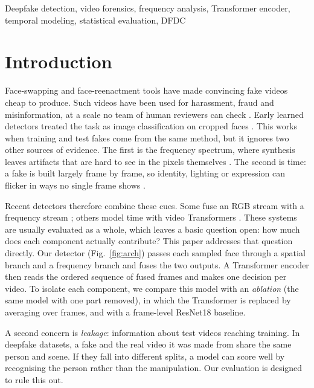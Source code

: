 \documentclass[conference]{IEEEtran}
\begin{document}
\begin{IEEEkeywords}
Deepfake detection, video forensics, frequency analysis, Transformer encoder,
temporal modeling, statistical evaluation, DFDC
\end{IEEEkeywords}

\section{Introduction}

Face-swapping and face-reenactment tools have made convincing fake videos
cheap to produce. Such videos have been used for harassment, fraud and
misinformation, at a scale no team of human reviewers can check
\cite{tolosana2020survey}. Early learned detectors treated the task as image
classification on cropped faces \cite{rossler2019faceforensics}. This works
when training and test fakes come from the same method, but it ignores two
other sources of evidence. The first is the frequency spectrum, where
synthesis leaves artifacts that are hard to see in the pixels themselves
\cite{qian2020thinking,tan2024freqnet}. The second is time: a fake is built
largely frame by frame, so identity, lighting or expression can flicker in
ways no single frame shows \cite{wang2023altfreezing}.

Recent detectors therefore combine these cues. Some fuse an RGB stream with a
frequency stream \cite{luo2021highfreq,wang2023sfdg}; others model time with
video Transformers \cite{zhao2023istvt}. These systems are usually evaluated
as a whole, which leaves a basic question open: how much does each component
actually contribute? This paper addresses that question directly. Our
detector (Fig.~\ref{fig:arch}) passes each sampled face through a spatial
branch and a frequency branch and fuses the two outputs. A Transformer
encoder \cite{vaswani2017attention} then reads the ordered sequence of fused
frames and makes one decision per video. To isolate each component, we
compare this model with an \emph{ablation} (the same model with one part
removed), in which the Transformer is replaced by averaging over frames, and
with a frame-level ResNet18 \cite{he2016deep} baseline.

A second concern is \emph{leakage}: information about test videos reaching
training. In deepfake datasets, a fake and the real video it was made from
share the same person and scene. If they fall into different splits, a model
can score well by recognising the person rather than the manipulation. Our
evaluation is designed to rule this out.
\end{document}
